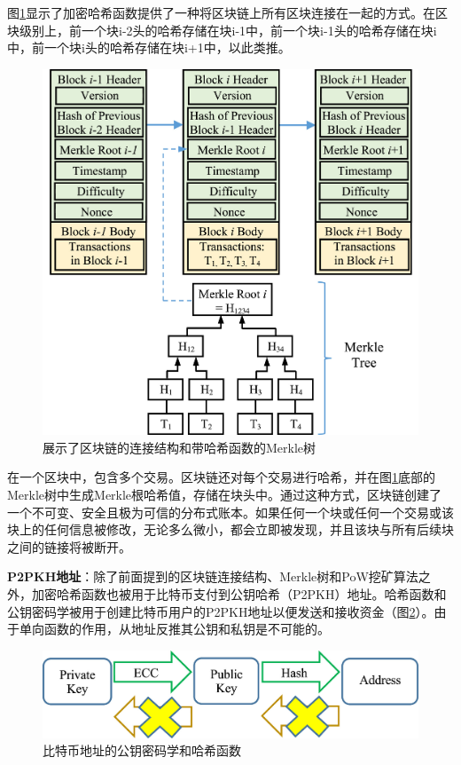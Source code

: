 \begin{translation}
图\ref{fig:展示了区块链的连接结构和带哈希函数的Merkle树}显示了加密哈希函数提供了一种将区块链上所有区块连接在一起的方式。在区块级别上，前一个块i-2头的哈希存储在块i-1中，前一个块i-1头的哈希存储在块i中，前一个块i头的哈希存储在块i+1中，以此类推。

\begin{figure}
	\centering
	\includegraphics[width=\textwidth]{figures/trans3.jpg}
	\caption{展示了区块链的连接结构和带哈希函数的Merkle树}
	\label{fig:展示了区块链的连接结构和带哈希函数的Merkle树}
\end{figure}

在一个区块中，包含多个交易。区块链还对每个交易进行哈希，并在图\ref{fig:展示了区块链的连接结构和带哈希函数的Merkle树}底部的Merkle树中生成Merkle根哈希值，存储在块头中。通过这种方式，区块链创建了一个不可变、安全且极为可信的分布式账本。如果任何一个块或任何一个交易或该块上的任何信息被修改，无论多么微小，都会立即被发现，并且该块与所有后续块之间的链接将被断开。

\textbf{P2PKH地址}：除了前面提到的区块链连接结构、Merkle树和PoW挖矿算法之外，加密哈希函数也被用于比特币支付到公钥哈希（P2PKH）地址\cite{art42}。哈希函数和公钥密码学被用于创建比特币用户的P2PKH地址以便发送和接收资金（图\ref{fig:比特币地址的公钥密码学和哈希函数}）。由于单向函数的作用，从地址反推其公钥和私钥是不可能的。

\begin{figure}
	\centering
	\includegraphics[width=\textwidth]{figures/trans4.jpg}
	\caption{比特币地址的公钥密码学和哈希函数}
	\label{fig:比特币地址的公钥密码学和哈希函数}
\end{figure}


\end{translation}

